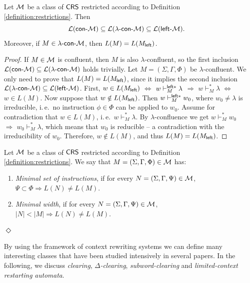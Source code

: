 \begin{lemma}\label{lemma:lambda}
Let $\textup{\sf $\mathcal{M}$}$ be a class of $\mbox{\sf CRS\/}$ restricted according to Definition \ref{definition:restrictions}. Then $${\cal L}(\textup{\sf con-\textup{\sf $\mathcal{M}$}}) \subseteq {\cal L}(\textup{\sf $\lambda$-con-\textup{\sf $\mathcal{M}$}}) \subseteq {\cal L}(\textup{\sf left-\textup{\sf $\mathcal{M}$}}).$$
Moreover, if $M \in \textup{\sf $\lambda$-con-\textup{\sf $\mathcal{M}$}}$, then $L(M) = L(M_{\sf left})$.
\end{lemma}

\begin{proof}
If $M \in \textup{\sf $\mathcal{M}$}$ is confluent, then $M$ is also $\lambda$-confluent, so the first inclusion ${\cal L}(\textup{\sf con-\textup{\sf $\mathcal{M}$}}) \subseteq {\cal L}(\textup{\sf $\lambda$-con-\textup{\sf $\mathcal{M}$}})$ holds trivially. Let $M=(\Sigma, \Gamma, \Phi)$ be $\lambda$-confluent. We only need to prove that $L(M) = L(M_{\sf left})$, since it implies the second inclusion $ {\cal L}(\textup{\sf $\lambda$-con-\textup{\sf $\mathcal{M}$}}) \subseteq {\cal L}(\textup{\sf left-\textup{\sf $\mathcal{M}$}})$. First, $w \in L(M_{\sf left})$ $\Leftrightarrow$ $w \vdash^{{\sf left}*}_M \lambda$ $\Rightarrow$ $w \vdash_M^* \lambda$ $\Leftrightarrow$ $w \in L(M)$. Now suppose that $w \notin L(M_{\sf left})$. Then $w \vdash^{{\sf left}*}_M w_0$, where $w_0 \neq \lambda$ is irreducible, i.\,e.\ no instruction $\phi \in \Phi$ can be applied to $w_0$. Assume for contradiction that $w \in L(M)$, i.\,e.\ $w \vdash_M^* \lambda$. By $\lambda$-confluence we get $w \vdash_M^* w_0$ $\Rightarrow$ $w_0 \vdash_M^* \lambda$, which means that $w_0$ is reducible -- a contradiction with the irreducibility of $w_0$.
Therefore, $w \notin L(M)$, and thus $L(M) = L(M_{\sf left})$.
\end{proof}

\begin{definition}\label{definition:nf}
Let $\textup{\sf $\mathcal{M}$}$ be a class of $\mbox{\sf CRS\/}$ restricted according to Definition \ref{definition:restrictions}. We say that $M = (\Sigma, \Gamma, \Phi) \in \textup{\sf $\mathcal{M}$}$ has:
\begin{enumerate}
\item \emph{Minimal set of instructions}, if for every $N = (\Sigma, \Gamma, \Psi) \in \textup{\sf $\mathcal{M}$}$, $\Psi \subset \Phi \Rightarrow L(N) \neq L(M)$.
\item \emph{Minimal width}, if for every $N = (\Sigma, \Gamma, \Psi) \in \textup{\sf $\mathcal{M}$}$, $|N| < |M| \Rightarrow L(N) \neq L(M)$.
\end{enumerate}
\hfill$\Diamond$
\end{definition}

By using the framework of context rewriting systems we can define many interesting classes that have been studied intensively in several papers. In the following, we discuss \emph{clearing}, \emph{$\Delta$-clearing}, \emph{subword-clearing} and \emph{limited-context restarting automata}.

